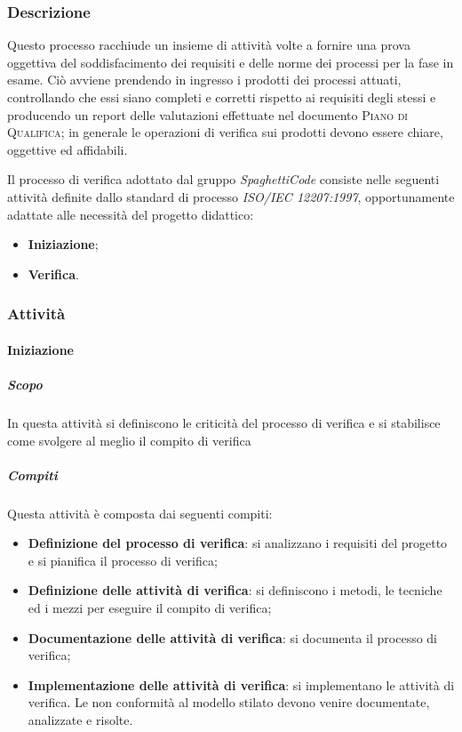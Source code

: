 \subsubsection{Descrizione}
Questo processo racchiude un insieme di attività volte a fornire una prova oggettiva del soddisfacimento dei requisiti e delle norme dei
processi per la fase in esame. Ciò avviene prendendo in ingresso i prodotti dei processi attuati, controllando che essi siano completi e corretti
rispetto ai requisiti degli stessi e producendo un report delle valutazioni effettuate nel documento \textsc{Piano di Qualifica}; in
generale le operazioni di verifica sui prodotti devono essere chiare, oggettive ed affidabili.

Il processo di verifica adottato dal gruppo \emph{SpaghettiCode} consiste nelle seguenti attività definite dallo standard di processo \emph{ISO/IEC 12207:1997}, opportunamente adattate alle necessità del progetto didattico:
\begin{itemize}
	\item \textbf{Iniziazione};
	\item \textbf{Verifica}.
\end{itemize}

\subsubsection{Attività}

\paragraph{Iniziazione}
\label{par:iniziazione}
\subparagraph{Scopo}
\label{par:iniziazione:scopo}
In questa attività si definiscono le criticità del processo di verifica e si stabilisce come svolgere al meglio il compito di verifica\\
\subparagraph{Compiti}
\label{par:iniziazione:compiti}
Questa attività è composta dai seguenti compiti:
\begin{itemize}
    \item \textbf{Definizione del processo di verifica}: si analizzano i requisiti del progetto e si pianifica il processo di verifica;
    \item \textbf{Definizione delle attività di verifica}: si definiscono i metodi, le tecniche ed i mezzi per eseguire il compito di verifica;
    \item \textbf{Documentazione delle attività di verifica}: si documenta il processo di verifica;
    \item \textbf{Implementazione delle attività di verifica}: si implementano le attività di verifica. Le non conformità al modello stilato devono venire documentate, analizzate e risolte.
\end{itemize}


